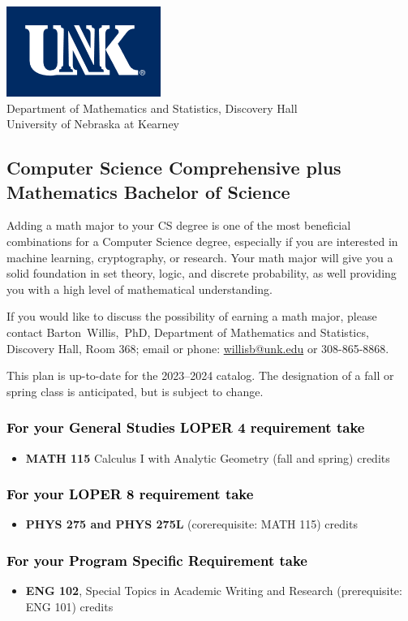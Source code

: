 \documentclass[10pt]{article}
\makeatletter
\newcommand{\calcone}{\textbf{MATH 115} Calculus I with Analytic Geometry (fall and spring) \dotfill 5 credits}
\newcommand{\calconeshort}{MATH 115}
\newcommand{\physics}{\textbf{PHYS 275 and PHYS 275L}  (corerequisite: \calconeshort) \dotfill 5 credits}
\newcommand{\contactbw}{\mbox{Barton Willis, PhD}, Department of Mathematics and Statistics,  Discovery Hall, Room 368;
email or phone: \href{mailto:willisb@unk.edu}{willisb@unk.edu} or 308-865-8868.}
\newcommand{\forinfo}[2]{If you would like to discuss the possibility of earning a math {#1}, please contact \contactbw}
\newcommand{\catalog}{2023--2024 }
\newcommand{\LOPER}{LOPER\xspace}
\newcommand{\uptodate}{This plan is up-to-date for  the \catalog catalog. The designation of a fall or spring class is 
anticipated, but  is subject to change.}
\newcommand{\myheading}{
\begin{flushleft}
\includegraphics[scale=0.3]{unk-logo}\\
\setcounter{footnote}{0}
\vspace{0.25in}
 \textcolor{unkblue}{Department of Mathematics and Statistics, Discovery Hall} \\
  \textcolor{unkblue}{University of Nebraska at Kearney}
\end{flushleft}}
\makeatother
\begin{document}
\newpage

\myheading



\vspace{-0.1in}
\subsection*{\textbf{\textcolor{unkblue}{Computer Science Comprehensive plus Mathematics Bachelor of Science}}}

Adding a math major to your CS degree is one of the most beneficial combinations for 
a Computer Science degree, especially if you are interested in machine learning, 
cryptography,   or research.  Your math major  will give you a solid foundation 
in set theory, logic, and discrete probability, 
as well providing you with a high level of mathematical understanding. 



\forinfo{major}{Computer Science Comprehensive degree}

\uptodate

\subsubsection*{\textcolor{black}{For your General Studies \LOPER 4 requirement take}}
\begin{itemize}
\item \calcone
\end{itemize}

\subsubsection*{\textcolor{black}{For your \LOPER 8 requirement take}}

\begin{itemize}
   \item \physics 
\end{itemize}

\subsubsection*{\textcolor{black}{For your Program Specific Requirement take}}

\begin{itemize}
   \item \textbf{ENG 102}, Special Topics in Academic Writing and Research (prerequisite: ENG 101)   credits
\end{itemize}
\end{document}

